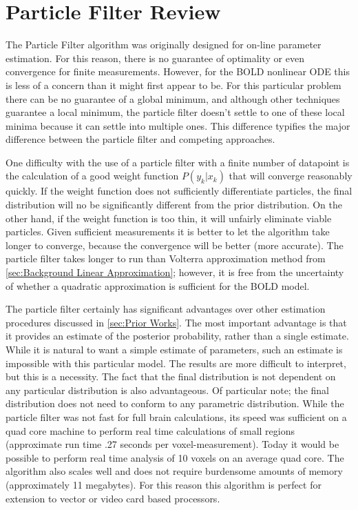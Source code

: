 \section{Particle Filter Review}
The Particle Filter algorithm was originally designed for on-line parameter 
estimation. For this reason, there is no guarantee of optimality or even 
convergence for finite measurements. However, for the BOLD nonlinear ODE 
this is less of a concern than it might first appear to be. For this
particular problem there can be no guarantee of a global minimum, and although
other techniques guarantee a local minimum, the particle filter doesn't settle 
to one of these local minima because it can settle into multiple ones. This
difference typifies the major difference between the particle filter and 
competing approaches. 

One difficulty
with the use of a particle filter with a finite number of datapoint is the calculation of a good
weight function $P(y_k | x_k)$  that will converge reasonably quickly. If the weight
function does not sufficiently differentiate particles, the final distribution will 
no be significantly different from the prior distribution. On the other hand, if the 
weight function is too thin, it will unfairly eliminate viable particles. Given sufficient
measurements it is better to let the algorithm take longer to converge, because the
convergence will be better (more accurate). The particle filter takes longer
to run than Volterra approximation method from \autoref{sec:Background Linear Approximation};
however, it is free from the uncertainty of whether a quadratic approximation is 
sufficient for the BOLD model. 

The particle filter certainly has significant advantages over other estimation procedures
discussed in \autoref{sec:Prior Works}. The most important advantage is that it provides
an estimate of the posterior probability, rather than a single estimate. While it is natural
to want a simple estimate of parameters, such an estimate is impossible with this particular
model. The results are more difficult to interpret, but this is a necessity. The fact that 
the final distribution is not dependent on any particular distribution is also advantageous.
Of particular note; the final distribution does not need to conform to any parametric
distribution. While the particle filter was not fast for full brain calculations, its speed
was sufficient on a quad core machine to perform real time calculations of small regions
(approximate run time .27 seconds per voxel-measurement). Today it would be possible
 to perform real time analysis of 10 voxels on an average quad core. The algorithm also scales
well and does not require burdensome amounts of memory (approximately 11 megabytes). 
For this reason this algorithm is perfect for extension to vector or video card
based processors. 

